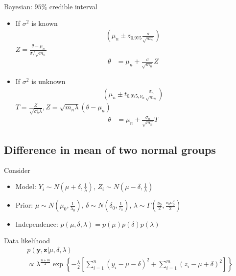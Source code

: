       Bayesian: $95\%$ credible interval
      \begin{itemize}
          \item If $\sigma^2$ is known
              \begin{align*}
                  \left(\mu_n \pm
                  z_{0.975}\frac{\sigma}{\sqrt{m_n}}\right)
              \end{align*}
          \subitem $Z = \frac{\theta-\mu_n}{\sigma/\sqrt{m_n}}$
              \begin{align*}
                  \theta &= \mu_n + \frac{\sigma}{\sqrt{m_n}}Z
              \end{align*}
          \item If $\sigma^2$ is unknown
              \begin{align*}
                  \left(\mu_n \pm t_{0.975,
                  \nu_n}\frac{\sigma_n}{\sqrt{m_n}}\right)
              \end{align*}
          \subitem $T = \frac{Z}{\sqrt{\sigma_n^2\lambda}},
          Z = \sqrt{m_n\lambda}(\theta-\mu_n)$
              \begin{align*}
                  \theta &= \mu_n +
                  \frac{\sigma_n}{\sqrt{m_n}}T
              \end{align*}
      \end{itemize}

      \subsection{Difference in mean of two normal groups}

      Consider

     \begin{itemize}
         \item Model: $Y_i\sim N(\mu+\delta, \frac{1}{\lambda})$,
         $Z_i \sim N(\mu-\delta, \frac{1}{\lambda})$
     \item Prior: $\mu\sim N(\mu_0, \frac{1}{\lambda_0})$,
         $\delta \sim N (\delta_0, \frac{1}{\tau_0})$,
         $\lambda \sim \Gamma(\frac{\nu_0}{2},
         \frac{\nu_0\sigma_0^2}{2})$
     \item Independence:
         $p(\mu, \delta, \lambda) = p(\mu) p(\delta) p(\lambda)$
     \end{itemize}

     Data likelihood
     \begin{align*}
         &p(\mathbf{y, z}|\mu, \delta, \lambda)\\
         &\propto
         \lambda^{\frac{n+m}{2}}
         \exp\left\{ 
             -\frac{\lambda}{2} \left[
                 \sum_{i=1}^n (y_i - \mu - \delta)^2 +
                 \sum_{i=1}^m (z_i - \mu + \delta)^2
             \right]
         \right\}
     \end{align*}

